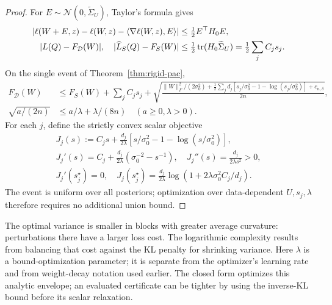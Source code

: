 \begin{proof}
For $E\sim\mathcal N(0,\widetilde\Sigma_U)$, Taylor's formula gives
\begin{align}
 |\ell(W+E,z)-\ell(W,z)-\langle\nabla\ell(W,z),E\rangle|
 &\le\tfrac12 E^\top H_0E,\\
 |L(Q)-F_\mathcal D(W)|,\quad|\widehat L_S(Q)-F_S(W)|
 &\le\tfrac12\operatorname{tr}(H_0\widetilde\Sigma_U)=\tfrac12\sum_j C_js_j.
\end{align}
On the single event of Theorem~\ref{thm:rigid-pac},
\begin{align}
 F_\mathcal D(W)
 &\le F_S(W)+\sum_jC_js_j+
 \sqrt{\frac{\|W\|_F^2/(2\sigma_0^2)
   +\frac12\sum_jd_j[s_j/\sigma_0^2-1-\log(s_j/\sigma_0^2)]
   +c_{n,\delta}}{2n}},\\
 \sqrt{a/(2n)}&\le a/\lambda+\lambda/(8n)\quad(a\ge0,\lambda>0).
\end{align}
For each $j$, define the strictly convex scalar objective
\begin{gather}
 J_j(s):=C_js+\frac{d_j}{2\lambda}
                       [s/\sigma_0^2-1-\log(s/\sigma_0^2)],\\
 J_j'(s)=C_j+\frac{d_j}{2\lambda}(\sigma_0^{-2}-s^{-1}),\quad
 J_j''(s)=\frac{d_j}{2\lambda s^2}>0,\\
 J_j'(s_j^\star)=0,\quad
 J_j(s_j^\star)=\frac{d_j}{2\lambda}
                                  \log(1+2\lambda\sigma_0^2C_j/d_j).
\end{gather}
The event is uniform over all posteriors; optimization over data-dependent
$U,s_j,\lambda$ therefore requires no additional union bound.
\end{proof}
The optimal variance is smaller in blocks with greater average curvature:
perturbations there have a larger loss cost. The logarithmic complexity results
from balancing that cost against the KL penalty for shrinking variance.
Here $\lambda$ is a bound-optimization parameter; it is separate from the
optimizer's learning rate and from weight-decay notation used earlier.
The closed form optimizes this analytic envelope; an evaluated certificate
can be tighter by using the inverse-KL bound before its scalar relaxation.

